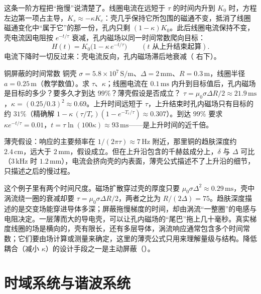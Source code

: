 这条一阶方程把“拖慢”说清楚了。线圈电流在远短于 $\tau$ 的时间内升到 $K_0$ 时，方程左边第一项占主导，$K_s\approx-\kappa K_c$：壳几乎保持它所包围的磁通不变，抵消了线圈磁通变化中“属于它”的那一份，孔内只剩 $(1-\kappa)K_0$。此后线圈电流保持不变，壳电流因电阻按 $e^{-t/\tau}$ 衰减，孔内磁场以同一时间常数爬向目标：
\begin{equation}
H(t)=K_0\bigl(1-\kappa\,e^{-t/\tau}\bigr)\qquad(t\text{ 从上升结束起算}).
\end{equation}
电流下降时一切反过来：壳电流反向，孔内磁场滞后地衰减（ 右下）。

\begin{example}{铜屏蔽的时间常数}\label{ex:eddy-shell}
铜壳 $\sigma=5.8\times10^7\,\mathrm{S/m}$、$\Delta=2\,\mathrm{mm}$、$R=0.3\,\mathrm m$，线圈半径 $a=0.25\,\mathrm m$（教学数值）。求 $\tau$、$\kappa$；线圈电流在 $0.1\,\mathrm{ms}$ 内升到目标值后，孔内磁场是目标的多少？要多久才到达 $99\%$？薄壳假设是否成立？
\solution
$\tau=\mu_0\sigma\Delta R/2\approx21.9\,\mathrm{ms}$，$\kappa=(0.25/0.3)^2\approx0.69$。上升时间远短于 $\tau$，上升结束时孔内磁场只有目标的约 $31\%$（精确解 $1-\kappa\,(\tau/T_r)(1-e^{-T_r/\tau})\approx0.307$）。到达 $99\%$ 要求 $\kappa e^{-t/\tau}=0.01$，$t=\tau\ln(100\kappa)\approx93\,\mathrm{ms}$——是上升时间的近千倍。

薄壳假设：响应的主要频率在 $1/(2\pi\tau)\approx7\,\mathrm{Hz}$ 附近，那里铜的趋肤深度约 $2.4\,\mathrm{cm}$，远大于 $2\,\mathrm{mm}$，假设成立。但在上升沿包含的千赫兹成分上，$\delta$ 与 $\Delta$ 可比（$3\,\mathrm{kHz}$ 时 $1.2\,\mathrm{mm}$），电流会挤向壳的内表面，薄壳公式描述不了上升沿的细节，只描述之后的慢过程。
\end{example}

\begin{pitfall}
这个例子里有两个时间尺度。磁场扩散穿过壳的厚度只要 $\mu_0\sigma\Delta^2\approx0.29\,\mathrm{ms}$，壳中涡流绕一圈的衰减却要 $\tau=\mu_0\sigma\Delta R/2$，两者之比为 $R/(2\Delta)=75$。趋肤深度描述的是交变场能穿进导体多深；屏蔽拖慢梯度的时间，却由涡流“一整圈”的电感与电阻决定。一层薄而大的导电壳，可以让孔内磁场的“尾巴”拖上几十毫秒。真实梯度线圈的场是横向的，壳有限长，还有多层导体，涡流响应通常包含多个时间常数；它们要由场计算或测量来确定，这里的薄壳公式只用来理解量级与结构。降低耦合（减小 $\kappa$）的设计手段之一是主动屏蔽（）。
\end{pitfall}

\section{时域系统与谐波系统}\label{sec:eddy-systems}

